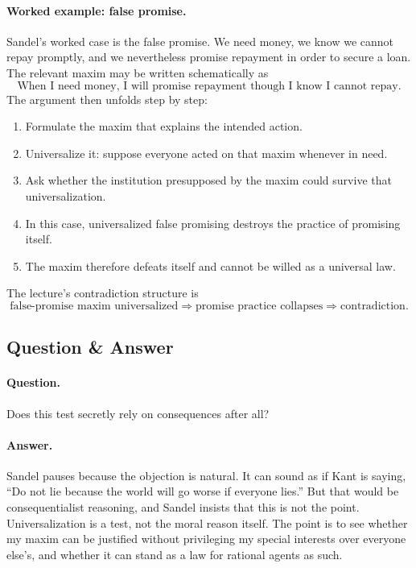 \paragraph{Worked example: false promise.} Sandel's worked case is the false promise. We need money, we know we cannot repay promptly, and we nevertheless promise repayment in order to secure a loan. The relevant maxim may be written schematically as
\begin{equation}
\text{When I need money, I will promise repayment though I know I cannot repay.}
\end{equation}
The argument then unfolds step by step:
\begin{enumerate}
\item Formulate the maxim that explains the intended action.
\item Universalize it: suppose everyone acted on that maxim whenever in need.
\item Ask whether the institution presupposed by the maxim could survive that universalization.
\item In this case, universalized false promising destroys the practice of promising itself.
\item The maxim therefore defeats itself and cannot be willed as a universal law.
\end{enumerate}
The lecture's contradiction structure is
\begin{equation}
\text{false-promise maxim universalized} \Longrightarrow \text{promise practice collapses} \Longrightarrow \text{contradiction}.
\end{equation}

\subsection{Question \& Answer}

\paragraph{Question.} Does this test secretly rely on consequences after all?

\paragraph{Answer.} Sandel pauses because the objection is natural. It can sound as if Kant is saying, ``Do not lie because the world will go worse if everyone lies.'' But that would be consequentialist reasoning, and Sandel insists that this is not the point. Universalization is a test, not the moral reason itself. The point is to see whether my maxim can be justified without privileging my special interests over everyone else's, and whether it can stand as a law for rational agents as such.

